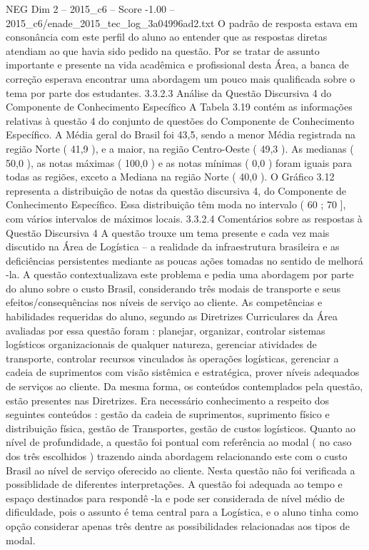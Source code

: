 \begin{textsample}{NEG Dim 2 – 2015\_c6 – Score -1.00 – 2015\_c6/enade\_2015\_tec\_log\_3a04996ad2.txt}
O padrão de resposta estava em consonância com este perfil do aluno ao entender que as respostas diretas atendiam ao que havia sido pedido na questão.
Por se tratar de assunto importante e presente na vida acadêmica e profissional desta Área, a banca de correção esperava encontrar uma abordagem um pouco mais qualificada sobre o tema por parte dos estudantes. 3.3.2.3 Análise da Questão Discursiva 4 do Componente de Conhecimento Específico A Tabela 3.19 contém as informações relativas à questão 4 do conjunto de questões do Componente de Conhecimento Específico.
A Média geral do Brasil foi 43,5, sendo a menor Média registrada na região Norte ( 41,9 ), e a maior, na região Centro-Oeste ( 49,3 ).
As medianas ( 50,0 ), as notas máximas ( 100,0 ) e as notas mínimas ( 0,0 ) foram iguais para todas as regiões, exceto a Mediana na região Norte ( 40,0 ).
O Gráfico 3.12 representa a distribuição de notas da questão discursiva 4, do Componente de Conhecimento Específico.
Essa distribuição têm moda no intervalo ( 60 ; 70 ], com vários intervalos de máximos locais. 3.3.2.4 Comentários sobre as respostas à Questão Discursiva 4 A questão trouxe um tema presente e cada vez mais discutido na Área de Logística – a realidade da infraestrutura brasileira e as deficiências persistentes mediante as poucas ações tomadas no sentido de melhorá -la.
A questão contextualizava este problema e pedia uma abordagem por parte do aluno sobre o custo Brasil, considerando três modais de transporte e seus efeitos/consequências nos níveis de serviço ao cliente.
As competências e habilidades requeridas do aluno, segundo as Diretrizes Curriculares da Área avaliadas por essa questão foram : planejar, organizar, controlar sistemas logísticos organizacionais de qualquer natureza, gerenciar atividades de transporte, controlar recursos vinculados às operações logísticas, gerenciar a cadeia de suprimentos com visão sistêmica e estratégica, prover níveis adequados de serviços ao cliente.
Da mesma forma, os conteúdos contemplados pela questão, estão presentes nas Diretrizes.
Era necessário conhecimento a respeito dos seguintes conteúdos : gestão da cadeia de suprimentos, suprimento físico e distribuição física, gestão de Transportes, gestão de custos logísticos.
Quanto ao nível de profundidade, a questão foi pontual com referência ao modal ( no caso dos três escolhidos ) trazendo ainda abordagem relacionando este com o custo Brasil ao nível de serviço oferecido ao cliente.
Nesta questão não foi verificada a possiblidade de diferentes interpretações.
A questão foi adequada ao tempo e espaço destinados para respondê -la e pode ser considerada de nível médio de dificuldade, pois o assunto é tema central para a Logística, e o aluno tinha como opção considerar apenas três dentre as possibilidades relacionadas aos tipos de modal.

\end{textsample}
